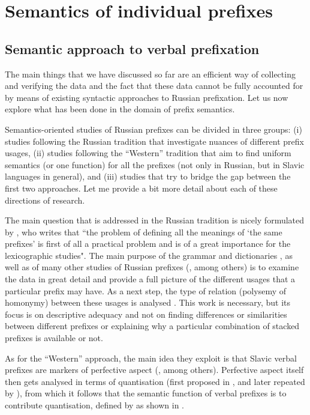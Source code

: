 \chapter{Semantics of individual prefixes} %
\label{Chapter5}
\section{Semantic approach to verbal prefixation}
The main things that we have discussed so far are an efficient way of collecting and verifying the data and the fact that these data cannot be fully accounted for by means of existing syntactic approaches to Russian prefixation. Let us now explore what has been done in the domain of prefix semantics.

Semantics-oriented studies of Russian prefixes can be divided in three groups: (i) studies following the Russian tradition that investigate nuances of different prefix usages, (ii) studies following the ``Western'' tradition that aim to find uniform semantics (or one function) for all the prefixes (not only in Russian, but in Slavic languages in general), and (iii) studies that try to bridge the gap between the first two approaches. Let me provide a bit more detail about each of these directions of research.

The main question that is addressed in the Russian tradition is nicely formulated by \citet[18]{Boguslawski:63}, who writes that ``the problem of defining all the meanings of `the same prefixes' is first of all a practical problem and is of a great importance for the lexicographic studies". The main purpose of the grammar \citep{Grammar:52, Shvedova:82} and dictionaries \citep{Dict:50, Dict:57}, as well as of many other studies of Russian prefixes (\citealt{Avilova:64, Golovin:59, Lopatin:97, Tixonov:98}, among others) is to examine the data in great detail and provide a full picture of the different usages that a particular prefix may have. As a next step, the type of relation (polysemy of homonymy) between these usages is analysed \citep{Krongauz:97, Plungyan:01}. This work is necessary, but its focus is on descriptive adequacy and not on finding differences or similarities between different prefixes or explaining why a particular combination of stacked prefixes is available or not.

As for the ``Western'' approach, the main idea they exploit is that Slavic verbal prefixes are markers of perfective aspect (\citealt[see, e.g.,][]{Binnick:91, Krifka:92, Zucchi:99}, among others). Perfective aspect itself then gets analysed in terms of quantisation (first proposed in \citealt{Krifka:86, Krifka:92}, and later repeated by \citealt{Pinon:95}), from which it follows that the semantic function of verbal prefixes is to contribute quantisation, defined by \citet{Krifka:86} as shown in . 

